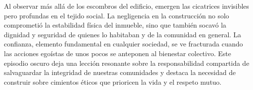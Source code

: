 \documentclass[letterpaper, 12pt]{article}
\begin{document}
Al observar más allá de los escombros del edificio, emergen
las cicatrices invisibles pero profundas en el tejido
social. La negligencia en la construcción no solo
comprometió la estabilidad física del inmueble, sino que
también socavó la dignidad y seguridad de quienes lo
habitaban y de la comunidad en general. La confianza,
elemento fundamental en cualquier sociedad, se ve
fracturada cuando las acciones egoístas de unos pocos se
anteponen al bienestar colectivo. Este episodio oscuro deja
una lección resonante sobre la responsabilidad compartida
de salvaguardar la integridad de nuestras comunidades y
destaca la necesidad de construir sobre cimientos éticos
que prioricen la vida y el respeto mutuo.

\printbibliography
\end{document}
